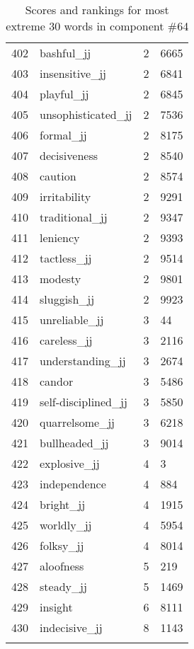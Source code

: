 \begin{longtable}[!htbp]{| rlr@{.}l |}
    402 & bashful\_jj & 2 & 6665 \\
    403 & insensitive\_jj & 2 & 6841 \\
    404 & playful\_jj & 2 & 6845 \\
    405 & unsophisticated\_jj & 2 & 7536 \\
    406 & formal\_jj & 2 & 8175 \\
    407 & decisiveness & 2 & 8540 \\
    408 & caution & 2 & 8574 \\
    409 & irritability & 2 & 9291 \\
    410 & traditional\_jj & 2 & 9347 \\
    411 & leniency & 2 & 9393 \\
    412 & tactless\_jj & 2 & 9514 \\
    413 & modesty & 2 & 9801 \\
    414 & sluggish\_jj & 2 & 9923 \\
    415 & unreliable\_jj & 3 & 44 \\
    416 & careless\_jj & 3 & 2116 \\
    417 & understanding\_jj & 3 & 2674 \\
    418 & candor & 3 & 5486 \\
    419 & self-disciplined\_jj & 3 & 5850 \\
    420 & quarrelsome\_jj & 3 & 6218 \\
    421 & bullheaded\_jj & 3 & 9014 \\
    422 & explosive\_jj & 4 & 3 \\
    423 & independence & 4 & 884 \\
    424 & bright\_jj & 4 & 1915 \\
    425 & worldly\_jj & 4 & 5954 \\
    426 & folksy\_jj & 4 & 8014 \\
    427 & aloofness & 5 & 219 \\
    428 & steady\_jj & 5 & 1469 \\
    429 & insight & 6 & 8111 \\
    430 & indecisive\_jj & 8 & 1143 \\
    \hline
    \caption{Scores and rankings for most extreme 30 words in component \#64} \\
\end{longtable}
